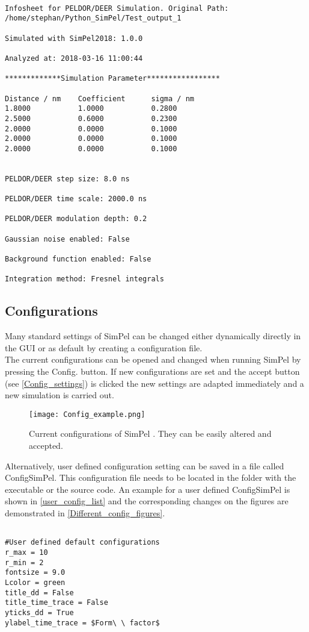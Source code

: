 \documentclass[pdftex,bezier,german,a4,twoside, headexclude,12pt,nochapterprefix, titlepage]{extarticle}
\newcommand{\simpel}{\textsf{SimPel} }
\begin{document}
\newpage
\begin{lstlisting}[caption={Example for an automatically aved information sheet.},label = Information_sheet]

Infosheet for PELDOR/DEER Simulation. Original Path:
/home/stephan/Python_SimPel/Test_output_1

Simulated with SimPel2018: 1.0.0

Analyzed at: 2018-03-16 11:00:44

*************Simulation Parameter*****************

Distance / nm 	 Coefficient	  sigma / nm
1.8000	         1.0000	          0.2800	         
2.5000	         0.6000	          0.2300	         
2.0000	         0.0000	          0.1000	         
2.0000	         0.0000	          0.1000	         
2.0000	         0.0000	          0.1000	         


PELDOR/DEER step size: 8.0 ns

PELDOR/DEER time scale: 2000.0 ns

PELDOR/DEER modulation depth: 0.2

Gaussian noise enabled: False

Background function enabled: False

Integration method: Fresnel integrals
\end{lstlisting}



\newpage
\FloatBarrier
\subsection{Configurations}
Many standard settings of \simpel can be changed either dynamically directly in the GUI or as default by creating a
configuration file.\\
The current configurations can be opened and changed when running  \simpel by pressing the Config. button.
If new configurations are set and the accept button (see \autoref{Config_settings})
is clicked the new settings are adapted immediately and a new simulation is carried out.
\begin{figure}[!htb]
\centering
\texttt{[image: Config\_example.png]}
    \caption{Current configurations of  \simpel. They can be easily altered and accepted.}
   \label{Config_settings}
\end{figure}
Alternatively, user defined configuration setting can be saved in a file called ConfigSimPel. This configuration file
needs to be located in the folder with the executable or the source code. An example for a user defined Config\simpel is
shown in \autoref{user_config_list} and the corresponding changes on the figures are demonstrated in \autoref{Different_config_figures}.
\newpage
\begin{lstlisting}[caption={Example for a user defined configuration file (ConfigSimPel).},label = user_config_list]

#User defined default configurations 
r_max = 10
r_min = 2
fontsize = 9.0
Lcolor = green
title_dd = False
title_time_trace = False
yticks_dd = True
ylabel_time_trace = $Form\ \ factor$
\end{lstlisting}
\end{document}
